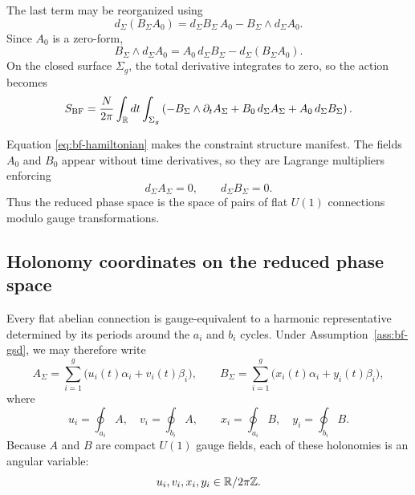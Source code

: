 \medskip

\noindent The last term may be reorganized using
\begin{equation*}
d_\Sigma(B_\Sigma A_0)=d_\Sigma B_\Sigma\,A_0-B_\Sigma\wedge d_\Sigma A_0.
\end{equation*}
Since $A_0$ is a zero-form,
\begin{equation*}
B_\Sigma\wedge d_\Sigma A_0=A_0\, d_\Sigma B_\Sigma-d_\Sigma(B_\Sigma A_0).
\end{equation*}
On the closed surface $\Sigma_g$, the total derivative integrates to zero, so the action becomes
\begin{equation}\label{eq:bf-hamiltonian}
S_{\mathrm{BF}}
=
\frac{N}{2\pi}\int_{\mathbb{R}} dt\int_{\Sigma_g}
\left(
-B_\Sigma\wedge \partial_t A_\Sigma
+B_0\,d_\Sigma A_\Sigma
+A_0\,d_\Sigma B_\Sigma
\right).
\end{equation}

\noindent Equation \eqref{eq:bf-hamiltonian} makes the constraint structure manifest. The fields $A_0$ and $B_0$ appear without time derivatives, so they are Lagrange multipliers enforcing
\begin{equation}\label{eq:bf-flat-constraints}
d_\Sigma A_\Sigma=0,
\qquad
d_\Sigma B_\Sigma=0.
\end{equation}
Thus the reduced phase space is the space of pairs of flat $U(1)$ connections modulo gauge transformations.

\subsection{Holonomy coordinates on the reduced phase space}

Every flat abelian connection is gauge-equivalent to a harmonic representative determined by its periods around the $a_i$ and $b_i$ cycles. Under Assumption~\ref{ass:bf-gsd}, we may therefore write
\begin{equation}\label{eq:bf-flat-expansion}
A_\Sigma=\sum_{i=1}^g \bigl(u_i(t)\alpha_i+v_i(t)\beta_i\bigr),
\qquad
B_\Sigma=\sum_{i=1}^g \bigl(x_i(t)\alpha_i+y_i(t)\beta_i\bigr),
\end{equation}
where
\begin{equation}\label{eq:bf-holonomies}
u_i=\oint_{a_i}A,
\quad
v_i=\oint_{b_i}A,
\qquad
x_i=\oint_{a_i}B,
\quad
y_i=\oint_{b_i}B.
\end{equation}
Because $A$ and $B$ are compact $U(1)$ gauge fields, each of these holonomies is an angular variable:
\begin{equation}\label{eq:bf-periodic-holonomies}
u_i,v_i,x_i,y_i \in \mathbb{R}/2\pi\mathbb{Z}.
\end{equation}

